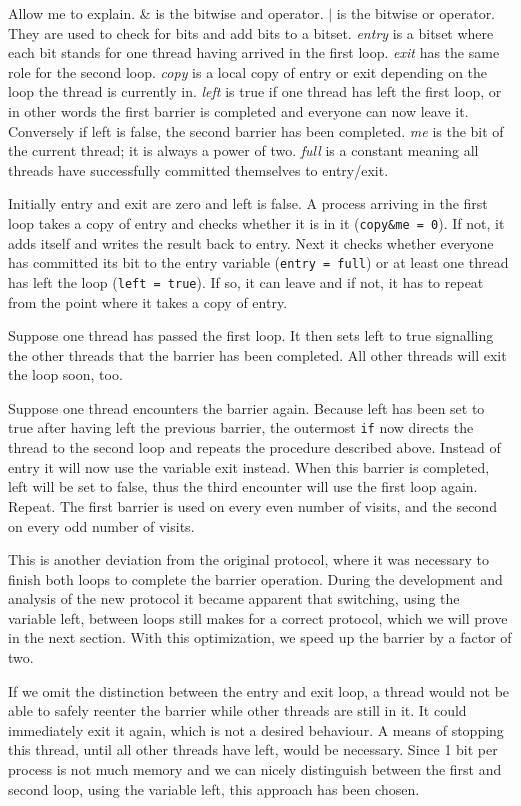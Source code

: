 \documentclass[a4paper, 10pt]{article}
\begin{document}
Allow me to explain. \& is the bitwise and operator. $|$ is the bitwise or operator. They are used to check for bits and add bits to a bitset. \emph{entry} is a bitset where each bit stands for one thread having arrived in the first loop. \emph{exit} has the same role for the second loop. \emph{copy} is a local copy of entry or exit depending on the loop the thread is currently in. \emph{left} is true if one thread has left the first loop, or in other words the first barrier is completed and everyone can now leave it. Conversely if left is false, the second barrier has been completed. \emph{me} is the bit of the current thread; it is always a power of two. \emph{full} is a constant meaning all threads have successfully committed themselves to entry/exit.

Initially entry and exit are zero and left is false. A process arriving in the first loop takes a copy of entry and checks whether it is in it (\texttt{copy\&me = 0}). If not, it adds itself and writes the result back to entry. Next it checks whether everyone has committed its bit to the entry variable (\texttt{entry = full}) or at least one thread has left the loop (\texttt{left = true}). If so, it can leave and if not, it has to repeat from the point where it takes a copy of entry.

Suppose one thread has passed the first loop. It then sets left to true signalling the other threads that the barrier has been completed. All other threads will exit the loop soon, too.

Suppose one thread encounters the barrier again. Because left has been set to true after having left the previous barrier, the outermost \texttt{if} now directs the thread to the second loop and repeats the procedure described above. Instead of entry it will now use the variable exit instead. When this barrier is completed, left will be set to false, thus the third encounter will use the first loop again. Repeat. The first barrier is used on every even number of visits, and the second on every odd number of visits.

This is another deviation from the original protocol, where it was necessary to finish both loops to complete the barrier operation. During the development and analysis of the new protocol it became apparent that switching, using the variable left, between loops still makes for a correct protocol, which we will prove in the next section. With this optimization, we speed up the barrier by a factor of two.

If we omit the distinction between the entry and exit loop, a thread would not be able to safely reenter the barrier while other threads are still in it. It could immediately exit it again, which is not a desired behaviour. A means of stopping this thread, until all other threads have left, would be necessary. Since 1 bit per process is not much memory and we can nicely distinguish between the first and second loop, using the variable left, this approach has been chosen.
\end{document}
